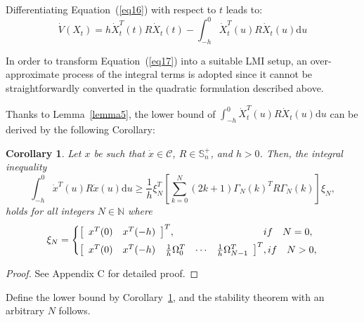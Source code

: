 \documentclass[a4paper]{cas-sc}
\newtheorem*{proof}{Proof}
\newtheorem{corollary}[theorem]{Corollary}
\begin{document}
Differentiating Equation~(\ref{eq16}) with respect to $t$ leads to:
\begin{equation}
  \dot V\left( {{X_t}} \right) = h\dot X_t^T(t)R{\dot X_t}(t) - \int_{ - h}^0 {\dot X_t^T} (u)R{\dot X_t}(u){\text{d}}u
  \label{eq17}
\end{equation}

In order to transform Equation~(\ref{eq17}) into a suitable LMI setup, an over-approximate process of the integral terms is adopted since it cannot be straightforwardly converted in the quadratic formulation described above.

Thanks to Lemma~\ref{lemma5}, the lower bound of $\int_{ - h}^0 {\dot X_t^T} (u)R{\dot X_t}(u){\text{d}}u$ can be derived by the following Corollary:
\begin{corollary}
  \label{corollary9}
  Let $x$ be such that $\dot x \in \mathcal{C}$, $R \in \mathbb{S}_n^ + $, and $h > 0$. Then, the integral inequality
  \begin{equation}
    \int_{ - h}^0 {{{\dot x}^T}} (u)R\dot x(u){\text{d}}u \geqslant \frac{1}{h}\xi _N^T\left[ {\sum\limits_{k = 0}^N {(2k + 1)} {\Gamma _N}{{(k)}^T}R{\Gamma _N}(k)} \right]{\xi _N},
    \label{eq18}
  \end{equation}
  holds for all integers $N \in \mathbb{N}$ where
  \begin{equation}
    {\xi _N} = \left\{ \begin{gathered}
      {\left[ {\begin{array}{*{20}{c}}
                {{x^T}(0)} & {{x^T}( - h)}
              \end{array}} \right]^T},\quad \quad \quad \quad \quad \quad \quad \quad \quad if\quad N = 0, \hfill \\
      {\left[ {\begin{array}{*{20}{c}}
              {{x^T}(0)} & {{x^T}( - h)} & {\frac{1}{h}\Omega _0^T} & \cdots & {\frac{1}{h}\Omega _{N - 1}^T}
            \end{array}} \right]^T},if\quad N > 0, \hfill \\
    \end{gathered}  \right.
    \label{eq19}
  \end{equation}
\end{corollary}
\begin{proof}
  See Appendix C for detailed proof.
\end{proof}

Define the lower bound by Corollary~\ref{corollary9}, and the stability theorem with an arbitrary $N$ follows.
\end{document}
